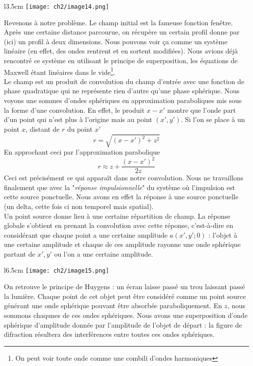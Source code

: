 \begin{wrapfigure}[11]{l}{3.5cm}
\vspace{-5mm}
\texttt{[image: ch2/image14.png]}
\end{wrapfigure}
Revenons à notre problème. Le champ initial est la fameuse fonction fenêtre. Après une certaine 
distance parcourue, on récupère un certain profil donne par (ici) un profil à deux dimensions. 
Nous pouvons voir ça comme un système linéaire (en effet, des ondes rentrent et en sortent 
modifiées). Nous avions déjà rencontré ce système en  utilisant le principe de superposition, 
les équations de Maxwell étant linéaires dans le vide\footnote{On peut voir toute onde comme 
une combili d'ondes harmoniques}. \\

Le champ est un produit de convolution du champ d'entrée avec une fonction de phase quadratique qui 
ne représente rien d'autre qu'une phase sphérique. Nous voyons une sommes d'ondes sphériques en 
approximation paraboliques mis sous la forme d'une convolution. En effet, le produit $x-x'$ montre 
que l'onde part d'un point qui n'est plus à l'origine mais au point $(x',y')$. Si l'on se place à 
un point $x$, distant de $r$ du point $x'$
\begin{equation}
r = \sqrt{(x-x')^2+z^2}
\end{equation}
En approchant ceci par l'approximation parabolique
\begin{equation}
r \approx z+\dfrac{(x-x')^2}{2z}
\end{equation}
Ceci est précisément ce qui apparaît dans notre convolution. Nous ne travaillons finalement 
que avec la "\textit{réponse impulsionnelle}" du système où l'impulsion est cette source 
ponctuelle. Nous avons en effet la réponse à une source ponctuelle (un delta, cette fois ci non 
temporel mais spatial).\\


Un point source donne lieu à une certaine répartition de champ. La réponse globale s'obtient en 
prenant la convolution avec cette réponse, c'est-à-dire en considérant que chaque point a une 
certaine amplitude $a(x',y';0)$ : l'objet à une certaine amplitude et chaque de ces amplitude 
rayonne une onde sphérique partant de $x',y'$ ou l'on a une certaine amplitude. \\

\begin{wrapfigure}[9]{l}{6.5cm}
\vspace{-5mm}
\texttt{[image: ch2/image15.png]}
\end{wrapfigure}
On retrouve le 
principe de Huygens : un écran laisse passé un trou laissant passé la lumière. Chaque point de 
cet objet peut être considéré comme un point source générant une onde sphérique pouvant être 
absorbée paraboliquement. En $z$, nous sommons chaqunes de ces ondes sphériques. Nous avons une 
superposition d'onde sphérique d'amplitude donnée par l'amplitude de l'objet de départ : la 
figure de difraction résultera des interférences entre toutes ces ondes sphériques.\\

